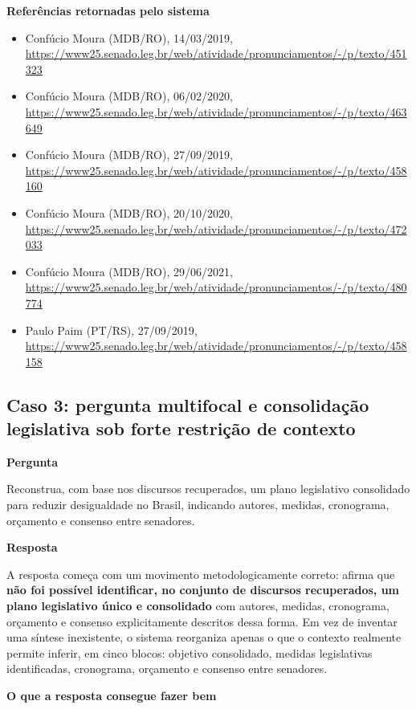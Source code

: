 \textbf{Referências retornadas pelo sistema}

\begin{itemize}
  \item Confúcio Moura (MDB/RO), 14/03/2019, \url{https://www25.senado.leg.br/web/atividade/pronunciamentos/-/p/texto/451323}
  \item Confúcio Moura (MDB/RO), 06/02/2020, \url{https://www25.senado.leg.br/web/atividade/pronunciamentos/-/p/texto/463649}
  \item Confúcio Moura (MDB/RO), 27/09/2019, \url{https://www25.senado.leg.br/web/atividade/pronunciamentos/-/p/texto/458160}
  \item Confúcio Moura (MDB/RO), 20/10/2020, \url{https://www25.senado.leg.br/web/atividade/pronunciamentos/-/p/texto/472033}
  \item Confúcio Moura (MDB/RO), 29/06/2021, \url{https://www25.senado.leg.br/web/atividade/pronunciamentos/-/p/texto/480774}
  \item Paulo Paim (PT/RS), 27/09/2019, \url{https://www25.senado.leg.br/web/atividade/pronunciamentos/-/p/texto/458158}
\end{itemize}

\subsection{Caso 3: pergunta multifocal e consolidação legislativa sob forte restrição de contexto}

\textbf{Pergunta}

Reconstrua, com base nos discursos recuperados, um plano legislativo consolidado para reduzir desigualdade no Brasil, indicando autores, medidas, cronograma, orçamento e consenso entre senadores.

\textbf{Resposta}

A resposta começa com um movimento metodologicamente correto: afirma que \textbf{não foi possível identificar, no conjunto de discursos recuperados, um plano legislativo único e consolidado} com autores, medidas, cronograma, orçamento e consenso explicitamente descritos dessa forma. Em vez de inventar uma síntese inexistente, o sistema reorganiza apenas o que o contexto realmente permite inferir, em cinco blocos: objetivo consolidado, medidas legislativas identificadas, cronograma, orçamento e consenso entre senadores.

\textbf{O que a resposta consegue fazer bem}

